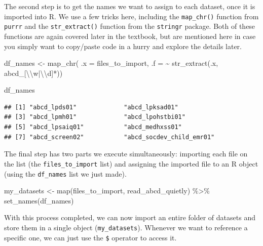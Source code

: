 \documentclass[
]{book}
\newenvironment{Shaded}{\begin{snugshade}}{\end{snugshade}}
\newcommand{\AttributeTok}[1]{\textcolor[rgb]{0.77,0.63,0.00}{#1}}
\newcommand{\FunctionTok}[1]{\textcolor[rgb]{0.00,0.00,0.00}{#1}}
\newcommand{\NormalTok}[1]{#1}
\newcommand{\OtherTok}[1]{\textcolor[rgb]{0.56,0.35,0.01}{#1}}
\newcommand{\SpecialCharTok}[1]{\textcolor[rgb]{0.00,0.00,0.00}{#1}}
\newcommand{\StringTok}[1]{\textcolor[rgb]{0.31,0.60,0.02}{#1}}
\begin{document}
The second step is to get the names we want to assign to each dataset, once it is imported into R. We use a few tricks here, including the \texttt{map\_chr()} function from \texttt{purrr} and the \texttt{str\_extract()} function from the \texttt{stringr} package. Both of these functions are again covered later in the textbook, but are mentioned here in case you simply want to copy/paste code in a hurry and explore the details later.

\begin{Shaded}
\begin{Highlighting}[]
\NormalTok{df\_names }\OtherTok{\textless{}{-}} \FunctionTok{map\_chr}\NormalTok{(}
  \AttributeTok{.x =}\NormalTok{ files\_to\_import, }
  \AttributeTok{.f =} \SpecialCharTok{\textasciitilde{}} \FunctionTok{str\_extract}\NormalTok{(.x, }\StringTok{\textquotesingle{}abcd\_[}\SpecialCharTok{\textbackslash{}\textbackslash{}}\StringTok{w|}\SpecialCharTok{\textbackslash{}\textbackslash{}}\StringTok{d]*\textquotesingle{}}\NormalTok{))}

\NormalTok{df\_names}
\end{Highlighting}
\end{Shaded}

\begin{verbatim}
## [1] "abcd_lpds01"             "abcd_lpksad01"          
## [3] "abcd_lpmh01"             "abcd_lpohstbi01"        
## [5] "abcd_lpsaiq01"           "abcd_medhxss01"         
## [7] "abcd_screen02"           "abcd_socdev_child_emr01"
\end{verbatim}

The final step has two parts we execute simultaneously: importing each file on the list (the \texttt{files\_to\_import} list) and assigning the imported file to an R object (using the \texttt{df\_names} list we just made).

\begin{Shaded}
\begin{Highlighting}[]
\NormalTok{my\_datasets }\OtherTok{\textless{}{-}} \FunctionTok{map}\NormalTok{(files\_to\_import, read\_abcd\_quietly) }\SpecialCharTok{\%\textgreater{}\%} 
  \FunctionTok{set\_names}\NormalTok{(df\_names)}
\end{Highlighting}
\end{Shaded}

With this process completed, we can now import an entire folder of datasets and store them in a single object (\texttt{my\_datasets}). Whenever we want to reference a specific one, we can just use the \texttt{\$} operator to access it.
\end{document}
